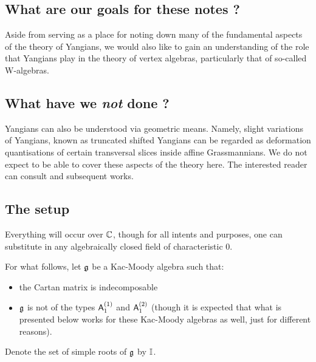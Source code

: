     \subsection{What are our goals for these notes ?}
        Aside from serving as a place for noting down many of the fundamental aspects of the theory of Yangians, we would also like to gain an understanding of the role that Yangians play in the theory of vertex algebras, particularly that of so-called W-algebras. 

    \subsection{What have we \textit{not} done ?}
        Yangians can also be understood via geometric means. Namely, slight variations of Yangians, known as truncated shifted Yangians can be regarded as deformation quantisations of certain transversal slices inside affine Grassmannians. We do not expect to be able to cover these aspects of the theory here. The interested reader can consult \cite{quantisation_of_affine_grassmannian_slices} and subsequent works.

    \subsection{The setup}
        Everything will occur over $\mathbb{C}$, though for all intents and purposes, one can substitute in any algebraically closed field of characteristic $0$.
    
        For what follows, let $\mathfrak{g}$ be a Kac-Moody algebra such that:
        \begin{itemize}
            \item the Cartan matrix is indecomposable
            \item $\mathfrak{g}$ is not of the types $\mathsf{A}_1^{(1)}$ and $\mathsf{A}_1^{(2)}$ (though it is expected that what is presented below works for these Kac-Moody algebras as well, just for different reasons).
        \end{itemize}
        Denote the set of simple roots of $\mathfrak{g}$ by $\mathbb{I}$.
        
